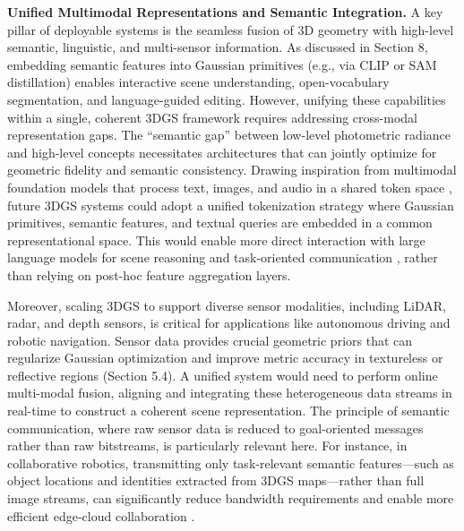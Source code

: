 \documentclass[11pt]{article}
\begin{document}
\textbf{Unified Multimodal Representations and Semantic Integration.} A key pillar of deployable systems is the seamless fusion of 3D geometry with high-level semantic, linguistic, and multi-sensor information. As discussed in Section 8, embedding semantic features into Gaussian primitives (e.g., via CLIP or SAM distillation) enables interactive scene understanding, open-vocabulary segmentation, and language-guided editing. However, unifying these capabilities within a single, coherent 3DGS framework requires addressing cross-modal representation gaps. The ``semantic gap'' between low-level photometric radiance and high-level concepts necessitates architectures that can jointly optimize for geometric fidelity and semantic consistency. Drawing inspiration from multimodal foundation models that process text, images, and audio in a shared token space \cite{ref777}, future 3DGS systems could adopt a unified tokenization strategy where Gaussian primitives, semantic features, and textual queries are embedded in a common representational space. This would enable more direct interaction with large language models for scene reasoning and task-oriented communication \cite{ref778}, rather than relying on post-hoc feature aggregation layers.

Moreover, scaling 3DGS to support diverse sensor modalities, including LiDAR, radar, and depth sensors, is critical for applications like autonomous driving and robotic navigation. Sensor data provides crucial geometric priors that can regularize Gaussian optimization and improve metric accuracy in textureless or reflective regions (Section 5.4). A unified system would need to perform online multi-modal fusion, aligning and integrating these heterogeneous data streams in real-time to construct a coherent scene representation. The principle of semantic communication, where raw sensor data is reduced to goal-oriented messages rather than raw bitstreams, is particularly relevant here. For instance, in collaborative robotics, transmitting only task-relevant semantic features---such as object locations and identities extracted from 3DGS maps---rather than full image streams, can significantly reduce bandwidth requirements and enable more efficient edge-cloud collaboration \cite{ref779}.
\end{document}
